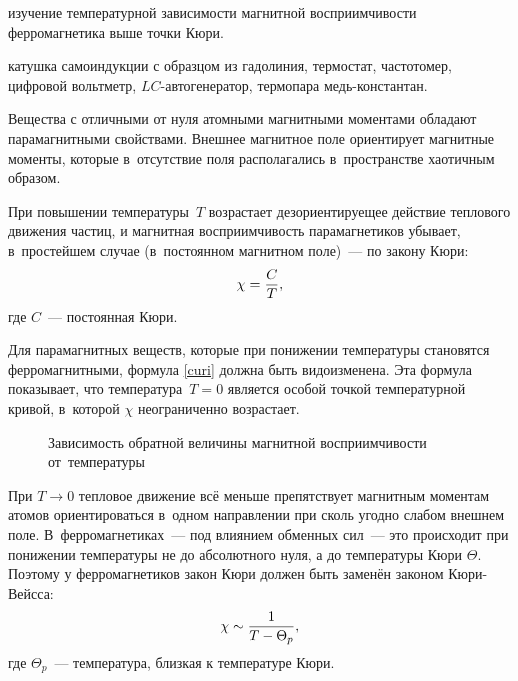
\begin{lab:aim}
	изучение температурной зависимости магнитной восприимчивости ферромагнетика выше точки Кюри.
\end{lab:aim}

\begin{lab:equipment}
	катушка самоиндукции с образцом из гадолиния, термостат, частотомер, цифровой вольтметр, $LC$-автогенератор,
	термопара медь-константан.
\end{lab:equipment}

Вещества с отличными от нуля атомными магнитными моментами обладают парамагнитными свойствами. Внешнее магнитное поле
ориентирует магнитные моменты, которые в~отсутствие поля располагались в~пространстве хаотичным образом.

При повышении температуры~$T$ возрастает дезориентируещее действие теплового движения частиц, и магнитная
восприимчивость парамагнетиков убывает, в~простейшем случае (в~постоянном магнитном поле)~--- по закону Кюри:
\begin{equation}%
	\chi=\frac{C}{T},
	\eqmark{curi}
\end{equation}
где $C$~--- постоянная Кюри.

Для парамагнитных веществ, которые при понижении температуры становятся ферромагнитными, формула \eqref{curi} должна быть
видоизменена. Эта формула показывает, что температура~$T=0$ является особой точкой температурной кривой, в~которой
$\chi$ неограниченно возрастает.


\begin{wrapfigure}{r}{0.4\textwidth}
	\caption{Зависимость обратной величины магнитной восприимчивости от~температуры}
\end{wrapfigure}

При $T\to 0$ тепловое движение всё меньше препятствует магнитным моментам атомов ориентироваться в~одном направлении при
сколь угодно слабом внешнем поле. В~ферромагнетиках~--- под влиянием обменных сил~--- это происходит при понижении
температуры не до абсолютного нуля, а до температуры Кюри $\Theta$. Поэтому у ферромагнетиков закон Кюри должен
быть заменён законом Кюри-Вейсса:
\begin{equation}%
	\chi\sim \frac{1}{T-\Theta_p},
	\eqmark{curi-veis}
\end{equation}
где $\Theta_p$~--- температура, близкая к температуре Кюри.


